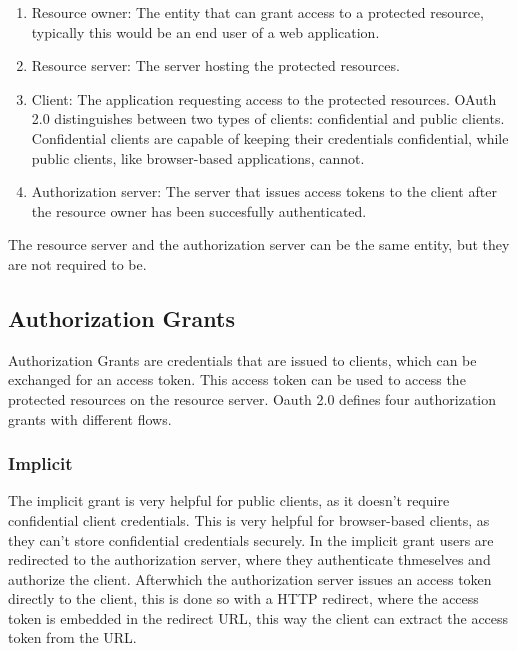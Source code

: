 \begin{enumerate}
  \item Resource owner: The entity that can grant access to a protected resource, typically this would be an end user of a web application.
  \item Resource server: The server hosting the protected resources.
  \item Client: The application requesting access to the protected resources. 
    OAuth 2.0 distinguishes between two types of clients: confidential and public clients.
    Confidential clients are capable of keeping their credentials confidential, while public clients, like browser-based applications, cannot.
  \item Authorization server: The server that issues access tokens to the client after the resource owner has been succesfully authenticated.
\end{enumerate}

The resource server and the authorization server can be the same entity, but they are not required to be.

\subsection{Authorization Grants}


Authorization Grants are credentials that are issued to clients, which can be exchanged for an access token.
This access token can be used to access the protected resources on the resource server.
Oauth 2.0 defines four authorization grants with different flows.


\subsubsection{Implicit}
\label{cha:relatedwork:oauth:implicit}

The implicit grant is very helpful for public clients, as it doesn't require confidential client credentials.
This is very helpful for browser-based clients, as they can't store confidential credentials securely.
In the implicit grant users are redirected to the authorization server, where they authenticate thmeselves and authorize the client.
Afterwhich the authorization server issues an access token directly to the client,
this is done so with a HTTP redirect, where the access token is embedded in the redirect URL,
this way the client can extract the access token from the URL.

